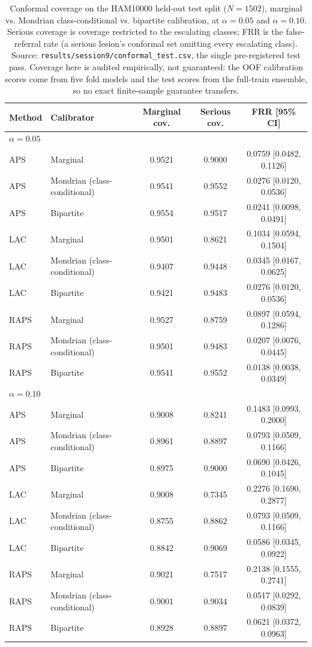 \begin{table}[t]
\centering
\caption{Conformal coverage on the HAM10000 held-out test split ($N=1502$), marginal vs. Mondrian class-conditional vs. bipartite calibration, at $\alpha=0.05$ and $\alpha=0.10$. Serious coverage is coverage restricted to the escalating classes; FRR is the false-referral rate (a serious lesion's conformal set omitting every escalating class). Source: \texttt{results/session9/conformal\_test.csv}, the single pre-registered test pass. Coverage here is audited empirically, not guaranteed: the OOF calibration scores come from five fold models and the test scores from the full-train ensemble, so no exact finite-sample guarantee transfers.}
\label{tab:conformal_edited}
\footnotesize
\setlength{\tabcolsep}{6pt}
\begin{tabular}{llccc}
\toprule
Method & Calibrator & Marginal cov. & Serious cov. & FRR [95\% CI] \\
\midrule
\multicolumn{5}{l}{\textit{$\alpha = 0.05$}} \\
APS & Marginal & 0.9521 & 0.9000 & 0.0759 [0.0482, 0.1126] \\
APS & Mondrian (class-conditional) & 0.9541 & 0.9552 & 0.0276 [0.0120, 0.0536] \\
APS & Bipartite & 0.9554 & 0.9517 & 0.0241 [0.0098, 0.0491] \\
LAC & Marginal & 0.9501 & 0.8621 & 0.1034 [0.0594, 0.1504] \\
LAC & Mondrian (class-conditional) & 0.9407 & 0.9448 & 0.0345 [0.0167, 0.0625] \\
LAC & Bipartite & 0.9421 & 0.9483 & 0.0276 [0.0120, 0.0536] \\
RAPS & Marginal & 0.9527 & 0.8759 & 0.0897 [0.0594, 0.1286] \\
RAPS & Mondrian (class-conditional) & 0.9501 & 0.9483 & 0.0207 [0.0076, 0.0445] \\
RAPS & Bipartite & 0.9541 & 0.9552 & 0.0138 [0.0038, 0.0349] \\
\midrule
\multicolumn{5}{l}{\textit{$\alpha = 0.10$}} \\
APS & Marginal & 0.9008 & 0.8241 & 0.1483 [0.0993, 0.2000] \\
APS & Mondrian (class-conditional) & 0.8961 & 0.8897 & 0.0793 [0.0509, 0.1166] \\
APS & Bipartite & 0.8975 & 0.9000 & 0.0690 [0.0426, 0.1045] \\
LAC & Marginal & 0.9008 & 0.7345 & 0.2276 [0.1690, 0.2877] \\
LAC & Mondrian (class-conditional) & 0.8755 & 0.8862 & 0.0793 [0.0509, 0.1166] \\
LAC & Bipartite & 0.8842 & 0.9069 & 0.0586 [0.0345, 0.0922] \\
RAPS & Marginal & 0.9021 & 0.7517 & 0.2138 [0.1555, 0.2741] \\
RAPS & Mondrian (class-conditional) & 0.9001 & 0.9034 & 0.0517 [0.0292, 0.0839] \\
RAPS & Bipartite & 0.8928 & 0.8897 & 0.0621 [0.0372, 0.0963] \\
\bottomrule
\end{tabular}
\end{table}

